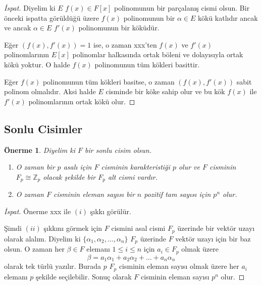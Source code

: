 \documentclass[draft]{article}
\newtheorem{prop}[thm]{Önerme}
\theoremstyle{definition}
\theoremstyle{remark}
\begin{document}
    	    \begin{proof}[İspat]
    	        Diyelim ki $E$ $f(x) \in F[x]$ polinomunun bir parçalanış cismi olsun. Bir önceki ispatta görüldüğü üzere $f(x)$ polinomunun bir $\alpha \in E$ kökü katlıdır ancak ve ancak $\alpha \in E$ $f'(x)$ polinomunun bir köküdür.\par
    	        Eğer $(f(x), f'(x)) = 1$ ise, o zaman xxx'ten $f(x)$ ve $f'(x)$ polinomlarının $E[x]$ polinomlar halkasında ortak böleni ve dolayısıyla ortak kökü yoktur. O halde $f(x)$ polinomunun tüm kökleri basittir.\par
    	        Eğer $f(x)$ polinomunun tüm kökleri basitse, o zaman $(f(x), f'(x))$ sabit polinom olmalıdır. Aksi halde $E$ cisminde bir köke sahip olur ve bu kök $f(x)$ ile $f'(x)$ polinomlarının ortak kökü olur.
    	    \end{proof}
	        
    	\subsection{Sonlu Cisimler}
    	
    	    \begin{prop}
    	        Diyelim ki $F$ bir sonlu cisim olsun.
    	        \begin{enumerate}
				\renewcommand{\labelenumi}{(\roman{enumi})}
				    \item O zaman bir $p$ asalı için $F$ cisminin karakteristiği $p$ olur ve $F$ cisminin $F_p \cong \mathbb{Z}_p$ olacak şekilde bir $F_p$ alt cismi vardır.
				    \item O zaman $F$ cisminin eleman sayısı bir $n$ pozitif tam sayısı için $p^n$ olur.
				\end{enumerate}
    	    \end{prop}
    	    
    	    \begin{proof}[İspat]
    	        Önerme xxx ile $(i)$ şıkkı görülür.\par
    	        Şimdi $(ii)$ şıkkını görmek için $F$ cismini asal cismi $F_p$ üzerinde bir vektör uzayı olarak alalım. Diyelim ki $\{\alpha_1, \alpha_2, \dots, \alpha_n\}$ $F_p$ üzerinde $F$ vektör uzayı için bir baz olsun. O zaman her $\beta \in F$ elemanı $1 \leq i \leq n$ için $a_i \in F_p$ olmak üzere
    	        \begin{equation*}
    	            \beta = a_1\alpha_1 + a_2\alpha_2 + \dots + a_n\alpha_n
    	        \end{equation*}
    	        olarak tek türlü yazılır. Burada $p$ $F_p$ cisminin eleman sayısı olmak üzere her $a_i$ elemanı $p$ şekilde seçilebilir. Sonuç olarak $F$ cisminin eleman sayısı $p^n$ olur.
    	    \end{proof}
    	    
\end{document}

